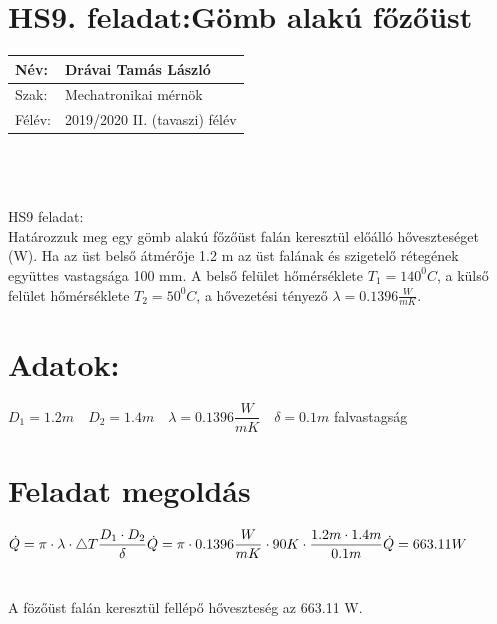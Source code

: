 

\section*{HS9. feladat:Gömb alakú főzőüst }

\begin{tabular}{ | p{1.5cm} | p{11cm} | } 
	\hline
	Név: & Drávai Tamás László\\ 
	\hline
	Szak: & Mechatronikai mérnök \\ 
	\hline
	Félév: & 2019/2020 II. (tavaszi) félév \\ 
	\hline
\end{tabular}
\\
\\
\\HS9 feladat:\\
Határozzuk meg egy gömb alakú főzőüst falán keresztül előálló hőveszteséget (W).  Ha az üst belső átmérője 1.2 m az üst falának és szigetelő rétegének együttes vastagsága 100 mm. A belső felület hőmérséklete $T_1=140^0 C$, a külső felület hőmérséklete $T_2=50^0 C$, a hővezetési tényező $\lambda= 0.1396\frac{W}{mK}$.
\section*{ {Adatok:}}
$D_1=1.2 m \quad D_2=1.4 m \quad \lambda=0.1396  \dfrac{W}{mK} \quad \delta=0.1m$ falvastagság \\


\section*{Feladat megoldás}
$
\dot{Q} =\pi\cdot \lambda\cdot\bigtriangleup T \dfrac{D_1 \cdot D_2}{\delta}
\\
\\
\dot{Q}=\pi \cdot 0.1396 \dfrac{W}{mK} \cdot  90K \cdot\dfrac{1.2m \cdot 1.4 m}{0.1m}\\
\\
\dot{Q}=663.11 W $\\
\\
\\
A fözőüst falán keresztül fellépő hőveszteség az 663.11 W.\\

